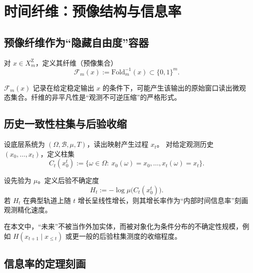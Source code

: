 \section{时间纤维：预像结构与信息率}

\subsection{预像纤维作为“隐藏自由度”容器}

\begin{definition}[时间纤维]\label{def:time-fiber}
对 $x\in X_m^{\mathrm Z}$，定义其纤维（预像集合）
\[
\mathcal{F}_m(x):=\mathrm{Fold}_m^{-1}(x)\subset\{0,1\}^m.
\]
\end{definition}

\begin{remark}
$\mathcal{F}_m(x)$ 记录在给定稳定输出 $x$ 的条件下，可能产生该输出的原始窗口读出微观态集合。纤维的非平凡性是“观测不可逆压缩”的严格形式。
\end{remark}

\subsection{历史一致性柱集与后验收缩}

\begin{definition}[历史一致性柱集]\label{def:cylinder-set}
设底层系统为 $(\Omega,\mathcal{B},\mu,T)$，读出映射产生过程 $x_t$。
对给定观测历史 $(x_0,\dots,x_t)$，定义柱集
\[
C_t(x_0^t):=\{\omega\in\Omega:\ x_0(\omega)=x_0,\dots,x_t(\omega)=x_t\}.
\]
\end{definition}

\begin{definition}[时间作为信息精化的内部标尺]\label{def:internal-time-scale}
设先验为 $\mu$。定义后验不确定度
\[
H_t:=-\log\mu\bigl(C_t(x_0^t)\bigr).
\]
若 $H_t$ 在典型轨道上随 $t$ 增长呈线性增长，则其增长率作为“内部时间信息率”刻画观测精化速度。
\end{definition}

\begin{remark}[“未来”的对象化口径]
在本文中，“未来”不被当作外加实体，而被对象化为条件分布的不确定性规模，例如
$
H(x_{t+1}\mid x_{\le t})
$
或更一般的后验柱集测度的收缩程度。
\end{remark}

\subsection{信息率的定理刻画}

